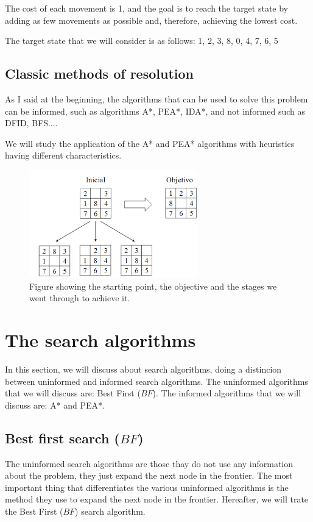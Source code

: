 \documentclass[runningheads]{llncs}
\begin{document}
The cost of each movement is 1, and the goal is to reach the target state by adding as few movements as possible 
and, therefore, achieving the lowest cost.

The target state that we will consider is as follows:
{1, 2, 3, 8, 0, 4, 7, 6, 5}

\subsection{Classic methods of resolution}
As I said at the beginning, the algorithms that can be used to solve this problem can be informed, such as algorithms 
A*, PEA*, IDA*, and not informed such as DFID, BFS....

We will study the application of the A* and PEA* algorithms with heuristics having different characteristics.

\begin{figure}
\centering
\includegraphics[width=0.65\textwidth]{8puzzle.png}
\caption{Figure showing the starting point, the objective and the stages we went through to achieve it.} \label{fig1}
\end{figure}

\section{The search algorithms}
In this section, we will discuss about search algorithms, doing a distincion between uninformed and informed search algorithms.
The uninformed algorithms that we will discuss are: Best First (\(BF\)).
The informed algorithms that we will discuss are: A* and PEA*.

\subsection{Best first search (\(BF\))}
The uninformed search algorithms are those thay do not use any information about the problem, they just expand the next node in the frontier.
The most important thing that differentiates the various uninformed algorithms is the method they use to expand the next node in the frontier.
Hereafter, we will trate the Best First (\(BF\)) search algorithm.
\end{document}
